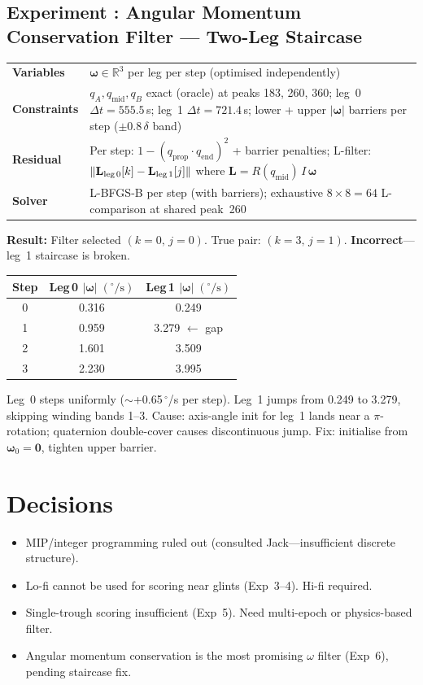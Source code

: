 \documentclass[11pt,a4paper]{article}
\makeatletter
\newcounter{expnum}
\newenvironment{experiment}[1]{%
  \refstepcounter{expnum}%
  \subsection*{Experiment \theexpnum: #1}%
  \vspace{-0.5em}%
}{\vspace{1em}}
\newcommand{\setup}[4]{%
  \noindent
  \begin{tabular}{@{}p{2.8cm}p{11cm}@{}}
    \toprule
    \textbf{Variables}    & #1 \\
    \textbf{Constraints}  & #2 \\
    \textbf{Residual}     & #3 \\
    \textbf{Solver}       & #4 \\
    \bottomrule
  \end{tabular}
  \vspace{0.8em}
}
\makeatother
\begin{document}
\begin{experiment}{Angular Momentum Conservation Filter --- Two-Leg Staircase}

\setup
  {$\boldsymbol{\omega} \in \mathbb{R}^3$ per leg per step (optimised independently)}
  {$q_A, q_\text{mid}, q_B$ exact (oracle) at peaks 183, 260, 360; leg~0 $\Delta t = 555.5\,$s; leg~1 $\Delta t = 721.4\,$s; lower + upper $|\boldsymbol{\omega}|$ barriers per step ($\pm 0.8\,\delta$ band)}
  {Per step: $1 - (q_\text{prop} \cdot q_\text{end})^2$ + barrier penalties;\; L-filter: $\|\mathbf{L}_{\text{leg\,0}}[k] - \mathbf{L}_{\text{leg\,1}}[j]\|$ where $\mathbf{L} = R(q_\text{mid})\,I\,\boldsymbol{\omega}$}
  {L-BFGS-B per step (with barriers); exhaustive $8 \times 8 = 64$ L-comparison at shared peak~260}

\textbf{Result:} Filter selected $(k{=}0,\, j{=}0)$. True pair: $(k{=}3,\, j{=}1)$. \textbf{Incorrect}---leg~1 staircase is broken.

\begin{center}
\begin{tabular}{ccc}
  \toprule
  Step & Leg\,0 $|\boldsymbol{\omega}|\;(^\circ/\text{s})$ & Leg\,1 $|\boldsymbol{\omega}|\;(^\circ/\text{s})$ \\
  \midrule
  0 & 0.316 & 0.249 \\
  1 & 0.959 & 3.279 $\leftarrow$ gap \\
  2 & 1.601 & 3.509 \\
  3 & 2.230 & 3.995 \\
  \bottomrule
\end{tabular}
\end{center}

Leg~0 steps uniformly ($\sim$+0.65$\,^\circ$/s per step). Leg~1 jumps from 0.249 to 3.279, skipping winding bands 1--3. Cause: axis-angle init for leg~1 lands near a $\pi$-rotation; quaternion double-cover causes discontinuous jump. Fix: initialise from $\boldsymbol{\omega}_0 = \mathbf{0}$, tighten upper barrier.

\end{experiment}

\section{Decisions}

\begin{itemize}[nosep]
  \item MIP/integer programming ruled out (consulted Jack---insufficient discrete structure).
  \item Lo-fi cannot be used for scoring near glints (Exp~3--4). Hi-fi required.
  \item Single-trough scoring insufficient (Exp~5). Need multi-epoch or physics-based filter.
  \item Angular momentum conservation is the most promising $\omega$ filter (Exp~6), pending staircase fix.
\end{itemize}
\end{document}

